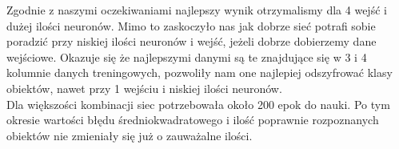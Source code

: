 \documentclass[12pt]{article}
\begin{document}
Zgodnie z naszymi oczekiwaniami najlepszy wynik otrzymalismy dla 4 wejść i dużej ilości neuronów. Mimo to zaskoczyło nas jak dobrze sieć potrafi sobie poradzić przy niskiej ilości neuronów i wejść, jeżeli dobrze dobierzemy dane wejściowe. Okazuje się że najlepszymi danymi są te znajdujące się w 3 i 4 kolumnie danych treningowych, pozwoliły nam one najlepiej odszyfrować klasy obiektów, nawet przy 1 wejściu i niskiej ilości neuronów.\\ Dla większości kombinacji siec potrzebowała około 200 epok do nauki. Po tym okresie wartości błędu średniokwadratowego i ilość poprawnie rozpoznanych obiektów nie zmieniały się już o zauważalne ilości.











\renewcommand\refname{Bibliografia}


\end{document}
